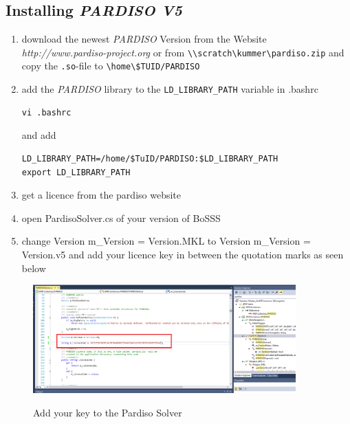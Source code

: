 \subsection{Installing \emph{PARDISO V5}}
\begin{enumerate}
\item download the newest \emph{PARDISO} Version from the Website \emph{http://www.pardiso-project.org} or from \verb|\\scratch\kummer\pardiso.zip| and copy the \verb|.so|-file to \verb|\home\$TUID/PARDISO|
\item  add the \emph{PARDISO} library to the \verb|LD_LIBRARY_PATH| variable in .bashrc
\begin{verbatim}
vi .bashrc
\end{verbatim}
and add
\begin{verbatim}
LD_LIBRARY_PATH=/home/$TuID/PARDISO:$LD_LIBRARY_PATH
export LD_LIBRARY_PATH
\end{verbatim}
\item get a licence from the pardiso website
\item open PardisoSolver.cs of your version of BoSSS
\item change Version m\_Version = Version.MKL to Version m\_Version = Version.v5 and add your licence key in between the quotation marks as seen below
\end{enumerate}
\begin{figure}[htbp] %
	\begin{centering}
		\includegraphics[width=0.9\textwidth]{Figures/pardiso_licence.png}\\
	\end{centering}
	\caption{Add your key to the Pardiso Solver}\label{fig:pardiso_licence}
\end{figure} %


